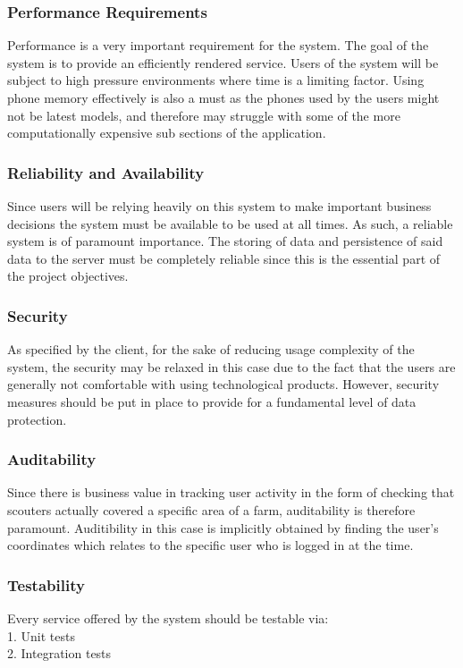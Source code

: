 \documentclass[11pt,a4paper,titlepage]{article}
\begin{document}
		\subsubsection{Performance Requirements}
			Performance is a very important requirement for the system. The goal of the system is to provide an efficiently rendered service. Users of the system will be subject to high pressure environments where time is a limiting factor. Using phone memory effectively is also a must as the phones used by the users might not be latest models, and therefore may struggle with some of the more computationally expensive sub sections of the application.
		\subsubsection{Reliability and Availability}
			Since users will be relying heavily on this system to make important business decisions the system must be available to be used at all times. As such, a reliable system is of paramount importance. The storing of data and persistence of said data to the server must be completely reliable since this is the essential part of the project objectives. 
		\subsubsection{Security}
			As specified by the client, for the sake of reducing usage complexity of the system, the security may be relaxed in this case due to the fact that the users are generally not comfortable with using technological products. However, security measures should be put in place  to provide for a fundamental level of data protection.
		\subsubsection{Auditability}
			Since there is business value in tracking user activity in the form of checking that scouters actually covered a specific area of a farm, auditability is therefore paramount. Auditibility in this case is implicitly obtained by finding the user's coordinates which relates to the specific user who is logged in at the time. 
		\subsubsection{Testability}
			Every service offered by the system should be testable via:\\
			1. Unit tests\\
			2. Integration tests
\end{document}
